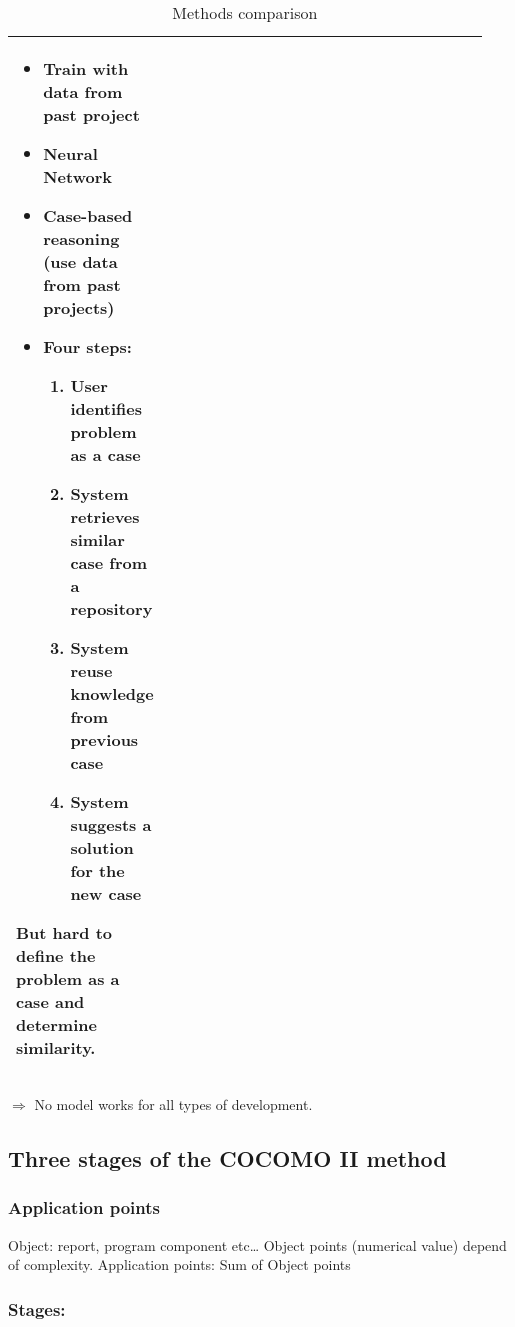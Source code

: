 \begin{table}[!ht]
\begin{tabular}{p{0.19\linewidth}|p{0.75\linewidth}}
\begin{minipage}{\linewidth}
\begin{itemize}
        					\item Train with data from past project
        					\item Neural Network
                                \item Case-based reasoning (use data from past projects)
                                \item Four steps:
                                    \begin{enumerate}
                                        \item User identifies problem as a case
                                        \item System retrieves similar case from a
                                        repository
                                        \item System reuse knowledge from previous
                                        case
                                        \item System suggests a solution for the
                                        new case
                                    \end{enumerate}
                            \end{itemize}
                            But hard to define the problem as a case and
                            determine similarity.\end{minipage} \\
        \bottomrule
    \end{tabular}
    \caption{Methods comparison}
\end{table}

$\Rightarrow$  No model works for all types of development.


\subsection{Three stages of the COCOMO II method}

\subsubsection{Application points}

Object: report, program component etc\ldots
Object points (numerical value) depend of complexity.
Application points: Sum of Object points

\subsubsection{Stages:}

